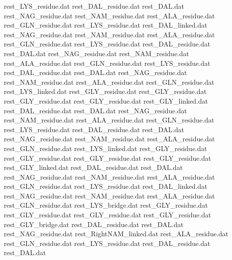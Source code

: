 rest_LYS_residue.dat            
rest_DAL_residue.dat            
rest_DAL.dat                    
rest_NAG_residue.dat            
rest_NAM_residue.dat            
rest_ALA_residue.dat            
rest_GLN_residue.dat            
rest_LYS_residue.dat            
rest_DAL_linked.dat             
rest_NAG_residue.dat            
rest_NAM_residue.dat            
rest_ALA_residue.dat            
rest_GLN_residue.dat            
rest_LYS_residue.dat            
rest_DAL_residue.dat            
rest_DAL.dat                    
rest_NAG_residue.dat            
rest_NAM_residue.dat            
rest_ALA_residue.dat            
rest_GLN_residue.dat            
rest_LYS_residue.dat            
rest_DAL_residue.dat            
rest_DAL.dat                    
rest_NAG_residue.dat            
rest_NAM_residue.dat            
rest_ALA_residue.dat            
rest_GLN_residue.dat            
rest_LYS_linked.dat             
rest_GLY_residue.dat
rest_GLY_residue.dat
rest_GLY_residue.dat
rest_GLY_residue.dat
rest_GLY_linked.dat
rest_DAL_residue.dat            
rest_DAL.dat                    
rest_NAG_residue.dat            
rest_NAM_residue.dat            
rest_ALA_residue.dat            
rest_GLN_residue.dat            
rest_LYS_residue.dat            
rest_DAL_residue.dat            
rest_DAL.dat                    
rest_NAG_residue.dat            
rest_NAM_residue.dat            
rest_ALA_residue.dat            
rest_GLN_residue.dat            
rest_LYS_linked.dat             
rest_GLY_residue.dat
rest_GLY_residue.dat
rest_GLY_residue.dat
rest_GLY_residue.dat
rest_GLY_linked.dat
rest_DAL_residue.dat            
rest_DAL.dat                    
rest_NAG_residue.dat            
rest_NAM_residue.dat            
rest_ALA_residue.dat            
rest_GLN_residue.dat            
rest_LYS_residue.dat            
rest_DAL_linked.dat             
rest_NAG_residue.dat            
rest_NAM_residue.dat            
rest_ALA_residue.dat            
rest_GLN_residue.dat            
rest_LYS_bridge.dat             
rest_GLY_residue.dat
rest_GLY_residue.dat
rest_GLY_residue.dat
rest_GLY_residue.dat
rest_GLY_bridge.dat
rest_DAL_residue.dat            
rest_DAL.dat                    
rest_NAG_residue.dat            
rest_RightNAM_linked.dat        
rest_ALA_residue.dat            
rest_GLN_residue.dat            
rest_LYS_residue.dat            
rest_DAL_residue.dat            
rest_DAL.dat                    
